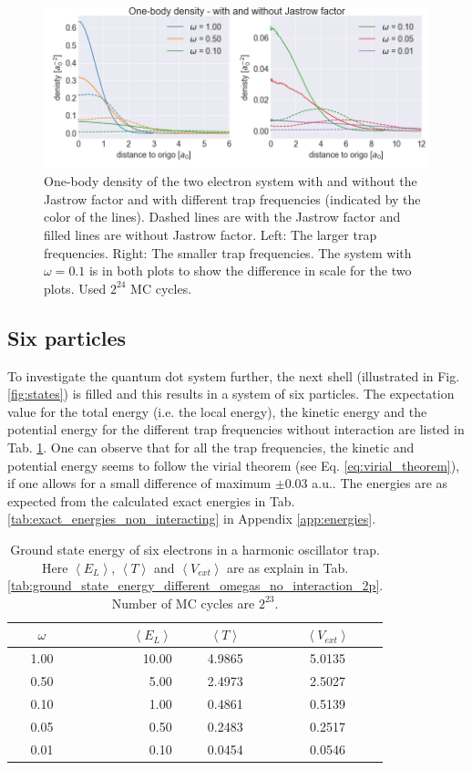 \begin{figure}[H]
\center
\includegraphics[width=0.85\linewidth]{../Results/one_body_density_interaction_2p}\caption{One-body density of the two electron system with and without the Jastrow factor and with different trap frequencies (indicated by the color of the lines). Dashed lines are with the Jastrow factor and filled lines are without Jastrow factor. Left: The larger trap frequencies. Right: The smaller trap frequencies.  The system with $\omega = 0.1$ is in both plots to show the difference in scale for the two plots. Used $2^{24}$ MC cycles. }\label{fig:one_body_density_interaction_2p}
\end{figure}

\subsection{Six particles}

To investigate the quantum dot system further, the next shell (illustrated in Fig. \ref{fig:states}) is filled and this results in a system of six particles. The expectation value for the total energy (i.e. the local energy), the kinetic energy and the potential energy for the different trap frequencies without interaction are listed in Tab. \ref{tab:ground_state_energy_importance_6p}. One can observe that for all the trap frequencies, the kinetic and potential energy seems to follow the virial theorem (see Eq. \ref{eq:virial_theorem}), if one allows for a small difference of maximum $\pm 0.03$ a.u.. The energies are as expected from the calculated exact energies in Tab.  \ref{tab:exact_energies_non_interacting} in Appendix \ref{app:energies}.

\begin{table}[H]\caption{Ground state energy of six electrons in a harmonic oscillator trap. Here $\left< E_L \right>$, $\left< T \right>$ and $\left< V_{ext}\right>$  are as explain in Tab. \ref{tab:ground_state_energy_different_omegas_no_interaction_2p}. Number of MC cycles are $2^{23}$. }\label{tab:ground_state_energy_importance_6p}
\center
\begin{tabular}{c|rcc}
$\omega$ & $\left< E_L \right>$  & $\left< T \right>$  & $\left< V_{ext}\right>$ \\ \hline
1.00 & 10.00 & 4.9865 & 5.0135\\ 
0.50 & 5.00 & 2.4973 & 2.5027\\
0.10 & 1.00 & 0.4861 & 0.5139\\
0.05 & 0.50 & 0.2483 & 0.2517\\
0.01 & 0.10 & 0.0454 & 0.0546\\
\end{tabular}
\end{table}

